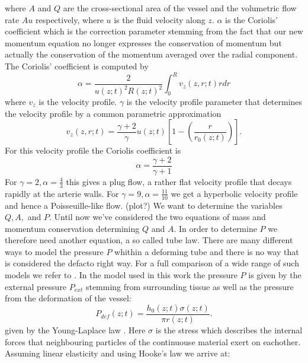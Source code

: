 \documentclass[a4paper, oneside]{discothesis}
\begin{document}
where $A$ and $Q$ are the cross-sectional area of the vessel and the volumetric flow rate $Au$ respectively, where $u$ is the fluid velocity along $z$.
$\alpha$ is the Coriolis' coefficient which is the correction parameter stemming from the fact that our new momentum equation no longer expresses the conservation of momentum but actually the conservation of the momentum averaged over the radial component.
The Coriolis' coefficient is computed by 
\begin{equation}
	\alpha = \frac{2}{u(z;t)^2R(z;t)^2} \int_0^R v_z(z, r; t) rdr 
\end{equation}
where $v_z$ is the velocity profile.\cite{article10002407}
$\gamma$ is the velocity profile parameter that determines the velocity profile by a common parametric approximation 
\begin{equation}
	v_z(z,r;t) = \frac{\gamma + 2}{\gamma} u(z;t) \left[ 1 - \left( \frac{r}{r_0(z;t)} \right) \right].
\end{equation}
For this velocity profile the Coriolis coefficient is
\begin{equation}
	\alpha = \frac{\gamma + 2}{\gamma + 1}
\end{equation}
For $\gamma=2, \alpha = \frac{4}{3}$ this gives a plug flow, a rather flat velocity profile that decays rapidly at the arterie walls.
For $\gamma=9, \alpha = \frac{11}{10} $ we get a hyperbolic velocity profile and hence a Poisseuille-like flow. (plot?)\cite{köppl2023dimension}
We want to determine the variables $Q, A,$ and $P$.
Until now we've considered the two equations of mass and momentum conservation determining $Q$ and $A$.
In order to determine $P$ we therefore need another equation, a so called tube law.
There are many different ways to model the pressure $P$ whithin a deforming tube and there is no way that is considered the defacto right way.
For a full comparison of a wide range of such models we refer to \cite{gomez2017analysis}.
In the model used in this work the pressure $P$ is given by the external pressure $P_{ext}$ stemming from surrounding tissue as well as the pressure from the deformation of the vessel:
\begin{equation}
	P_{def}(z;t) = \frac{h_0(z;t) \sigma(z;t)}{\pi r(z;t)}. \label{eq:pdef}
\end{equation}
given by the Young-Laplace law \cite{laplace1805traité} \cite{young1804essay}.
Here $\sigma$ is the stress which describes the internal forces that neighbouring particles of the continuouse material exert on eachother.
Assuming linear elasticity and using Hooke's law \cite{hooke1678lectures} we arrive at:
\end{document}
